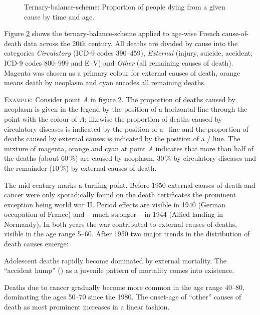 \documentclass[a4paper]{scrartcl}
\begin{document}
\begin{figure}[htb!]
\begin{subfigure}[t]{0.35\textwidth}
  \label{fig:tbslegend}
  \end{subfigure}%
  \caption{Ternary-balance-scheme: Proportion of people dying from a given cause by time and age.}
  \label{fig:tbs}
\end{figure}

Figure \ref{fig:tbs} shows the ternary-balance-scheme applied to age-wise French cause-of-death data across the 20th century. All deaths are divided by cause into the categories \emph{Circulatory} (ICD-9 codes 390--459), \emph{External} (injury, suicide, accident; ICD-9 codes 800--999 and E--V) and \emph{Other} (all remaining causes of death). Magenta was chosen as a primary colour for external causes of death, orange means death by neoplasm and cyan encodes all remaining deaths.

\textsc{Example:} Consider point \emph{A} in figure \ref{fig:tbs}. The proportion of deaths caused by neoplasm is given in the legend by the position of a horizontal line through the point with the colour of \emph{A}; likewise the proportion of deaths caused by circulatory diseases is indicated by the position of a \ line and the proportion of deaths caused by external causes is indicated by the position of a / line. The mixture of magenta, orange and cyan at point \emph{A} indicates that more than half of the deaths (about 60\,\%) are caused by neoplasm, 30\,\% by circulatory diseases and the remainder (10\,\%) by external causes of death.

The mid-century marks a turning point. Before 1950 external causes of death and cancer were only sporadically found on the death certificates the prominent exception being world war II. Period effects are visible in 1940 (German occupation of France) and -- much stronger -- in 1944 (Allied landing in Normandy). In both years the war contributed to external causes of deaths, visible in the age range 5--60. After 1950 two major trends in the distribution of death causes emerge:
\begin{inparaenum}
\item Adolescent deaths rapidly become dominated by external mortality. The \enquote{accident hump} (\cite{Heligman1980}) as a juvenile pattern of mortality comes into existence.
\item Deaths due to cancer gradually become more common in the age range 40--80, dominating the ages 50--70 since the 1980. The onset-age of \enquote{other} causes of death as most prominent increases in a linear fashion.
\end{inparaenum}
\end{document}
